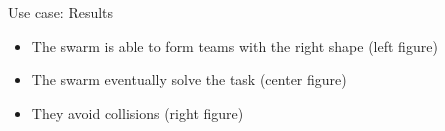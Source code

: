 \documentclass[presentation, 9pt]{beamer}\mode<presentation>{\usetheme{AMSBolognaFC}}
\begin{document}
\begin{frame}{Use case: Results}
\centering
{}
\\
\vspace{0.1cm}
\begin{exampleblock}{}
	\begin{itemize}
		\item The swarm is able to form teams with the right shape (left figure)
		\item The swarm eventually solve the task (center figure)
		\item They avoid collisions (right figure)
	\end{itemize}
\end{exampleblock}
\end{frame}
\end{document}
